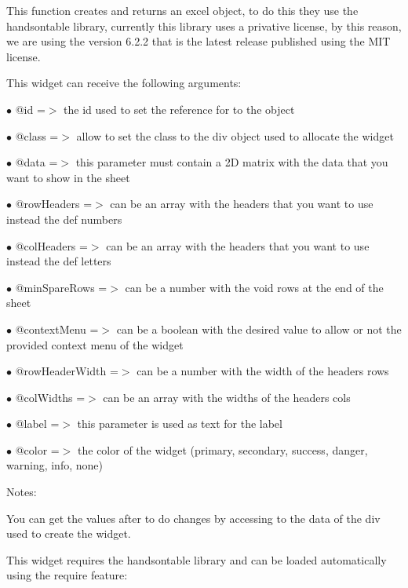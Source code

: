 \documentclass[a4paper]{article}
\begin{document}
This function creates and returns an excel object, to do this they use the handsontable library,
currently this library uses a privative license, by this reason, we are using the version 6.2.2
that is the latest release published using the MIT license.

This widget can receive the following arguments:

\begin{compactitem}
\item[\color{myblue}$\bullet$] @id             =$>$ the id used to set the reference for to the object
\item[\color{myblue}$\bullet$] @class          =$>$ allow to set the class to the div object used to allocate the widget
\item[\color{myblue}$\bullet$] @data           =$>$ this parameter must contain a 2D matrix with the data that you want to show
                   in the sheet
\item[\color{myblue}$\bullet$] @rowHeaders     =$>$ can be an array with the headers that you want to use instead the def numbers
\item[\color{myblue}$\bullet$] @colHeaders     =$>$ can be an array with the headers that you want to use instead the def letters
\item[\color{myblue}$\bullet$] @minSpareRows   =$>$ can be a number with the void rows at the end of the sheet
\item[\color{myblue}$\bullet$] @contextMenu    =$>$ can be a boolean with the desired value to allow or not the provided
                   context menu of the widget
\item[\color{myblue}$\bullet$] @rowHeaderWidth =$>$ can be a number with the width of the headers rows
\item[\color{myblue}$\bullet$] @colWidths      =$>$ can be an array with the widths of the headers cols
\item[\color{myblue}$\bullet$] @label          =$>$ this parameter is used as text for the label
\item[\color{myblue}$\bullet$] @color          =$>$ the color of the widget (primary, secondary, success, danger, warning, info, none)
\end{compactitem}

Notes:

You can get the values after to do changes by accessing to the data of the div used to create
the widget.

This widget requires the handsontable library and can be loaded automatically using the require
feature:
\end{document}
